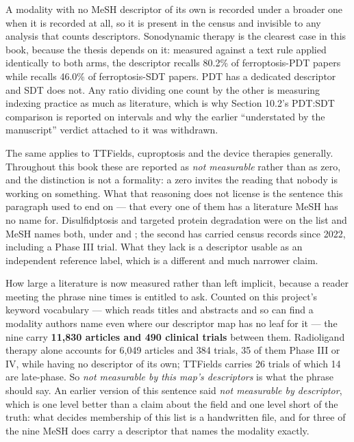 \documentclass[11pt,twoside,openright]{report}
\begin{document}
A modality with no MeSH descriptor of its own is recorded under a broader one when it is recorded at all, so it is present in the census and invisible to any analysis that counts descriptors. Sonodynamic therapy is the clearest case in this book, because the thesis depends on it: measured against a text rule applied identically to both arms, the descriptor  recalls 80.2\% of ferroptosis-PDT papers while  recalls 46.0\% of ferroptosis-SDT papers. PDT has a dedicated descriptor and SDT does not. Any ratio dividing one count by the other is measuring indexing practice as much as literature, which is why Section 10.2's PDT:SDT comparison is reported on intervals and why the earlier ``understated by the manuscript'' verdict attached to it was withdrawn.

The same applies to TTFields, cuproptosis and the device therapies generally. Throughout this book these are reported as \textit{not measurable} rather than as zero, and the distinction is not a formality: a zero invites the reading that nobody is working on something. What that reasoning does not license is the sentence this paragraph used to end on --- that every one of them has a literature MeSH has no name for. Disulfidptosis and targeted protein degradation were on the list and MeSH names both, under  and ; the second has carried census records since 2022, including a Phase III trial. What they lack is a descriptor usable as an independent reference label, which is a different and much narrower claim.

How large a literature is now measured rather than left implicit, because a reader meeting the phrase nine times is entitled to ask. Counted on this project's keyword vocabulary --- which reads titles and abstracts and so can find a modality authors name even where our descriptor map has no leaf for it --- the nine carry \textbf{11,830 articles and 490 clinical trials} between them. Radioligand therapy alone accounts for 6,049 articles and 384 trials, 35 of them Phase III or IV, while having no descriptor of its own; TTFields carries 26 trials of which 14 are late-phase. So \textit{not measurable by this map's descriptors} is what the phrase should say. An earlier version of this sentence said \textit{not measurable by descriptor}, which is one level better than a claim about the field and one level short of the truth: what decides membership of this list is a handwritten file, and for three of the nine MeSH does carry a descriptor that names the modality exactly.
\end{document}
